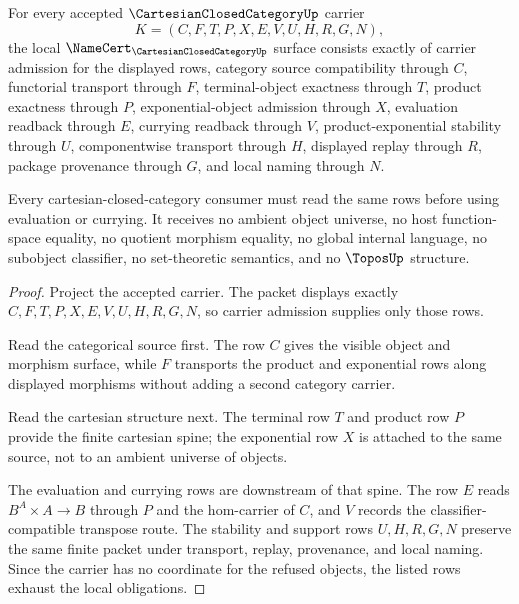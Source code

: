 \begin{theorem}
\label{thm:cartesian-closed-category-namecert-obligations}
For every accepted $\CartesianClosedCategoryUp$ carrier
$$
K=(C,F,T,P,X,E,V,U,H,R,G,N),
$$
the local $\NameCert_{\CartesianClosedCategoryUp}$ surface consists exactly of carrier admission for the displayed rows, category source compatibility through $C$, functorial transport through $F$, terminal-object exactness through $T$, product exactness through $P$, exponential-object admission through $X$, evaluation readback through $E$, currying readback through $V$, product-exponential stability through $U$, componentwise transport through $H$, displayed replay through $R$, package provenance through $G$, and local naming through $N$.

Every cartesian-closed-category consumer must read the same rows before using evaluation or currying. It receives no ambient object universe, no host function-space equality, no quotient morphism equality, no global internal language, no subobject classifier, no set-theoretic semantics, and no $\ToposUp$ structure.
\end{theorem}
\begin{proof}
Project the accepted carrier. The packet displays exactly $C,F,T,P,X,E,V,U,H,R,G,N$, so carrier admission supplies only those rows.

Read the categorical source first. The row $C$ gives the visible object and morphism surface, while $F$ transports the product and exponential rows along displayed morphisms without adding a second category carrier.

Read the cartesian structure next. The terminal row $T$ and product row $P$ provide the finite cartesian spine; the exponential row $X$ is attached to the same source, not to an ambient universe of objects.

The evaluation and currying rows are downstream of that spine. The row $E$ reads $B^A \times A \to B$ through $P$ and the hom-carrier of $C$, and $V$ records the classifier-compatible transpose route. The stability and support rows $U,H,R,G,N$ preserve the same finite packet under transport, replay, provenance, and local naming. Since the carrier has no coordinate for the refused objects, the listed rows exhaust the local obligations.
\end{proof}

